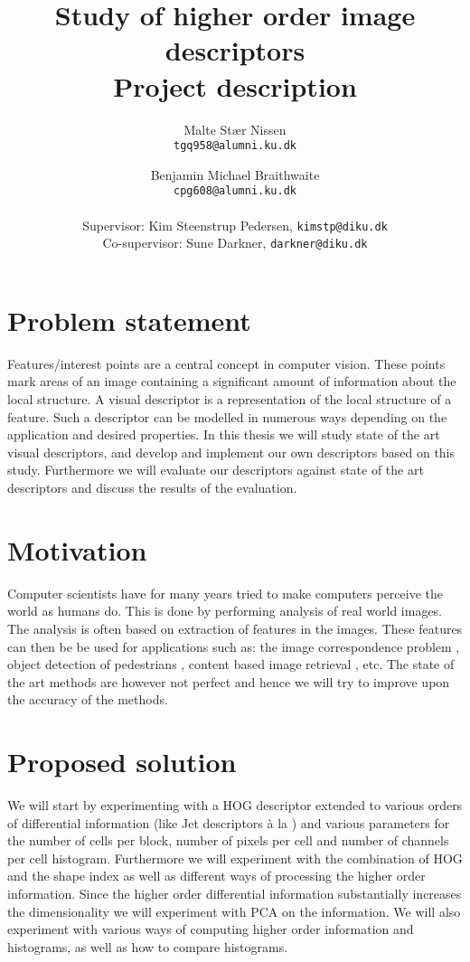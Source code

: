 \documentclass[11pt,a4paper]{article}
\title{\bfseries{Study of higher order image descriptors}\\Project description}
\author{
    Malte Stær Nissen \\\texttt{tgq958@alumni.ku.dk}
    \and
    Benjamin Michael Braithwaite \\ \texttt{cpg608@alumni.ku.dk}
    \\
    \\ \small{Supervisor: Kim Steenstrup Pedersen, \texttt{kimstp@diku.dk}}
    \\ \small{Co-supervisor: Sune Darkner, \texttt{darkner@diku.dk}}
    }
\begin{document}
\maketitle

\section{Problem statement}
Features/interest points are a central concept in computer vision. These
points mark areas of an image containing a significant amount of information
about the local structure. A visual descriptor is a representation of the
local structure of a feature. Such a descriptor can be modelled in numerous
ways depending on the application and desired properties. In this thesis we
will study state of the art visual descriptors, and develop and implement our
own descriptors based on this study. Furthermore we will evaluate our
descriptors against state of the art descriptors and discuss the results of the
evaluation.

\section{Motivation}
Computer scientists have for many years tried to make computers perceive
the world as humans do. This is done by performing analysis of real world
images. The analysis is often based on extraction of features in the images.
These features can then be be used for applications such as: the image
correspondence problem \cite{dahl2011finding}, object detection of pedestrians
\cite{felzenszwalb2008discriminatively}, content based image retrieval
\cite{smeulders2000content}, etc. The state of the art methods are however not
perfect and hence we will try to improve upon the accuracy of the methods.

\section{Proposed solution}
We will start by experimenting with a HOG descriptor extended to
various orders of differential information (like Jet descriptors à la
\cite{larsen2012jet}) and various parameters for the number of cells per
block, number of pixels per cell and number of channels per cell histogram.
Furthermore we will experiment with the combination of HOG and the shape
index \cite{koenderink1992surface} as well as different ways of processing
the higher order information. Since the higher order differential information
substantially increases the dimensionality we will experiment with PCA on the
information. We will also experiment with various ways of computing higher
order information and histograms, as well as how to compare histograms.
\end{document}
